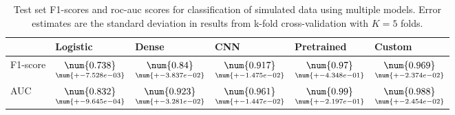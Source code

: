 \begin{table}
\centering
\caption{
Test set F1-scores and roc-auc scores for classification of simulated data using multiple models. 
Error estimates are the standard deviation in results from k-fold cross-validation 
with $K=5$ folds.
}
\label{tab:classification-simulated-f1-auc}
\begin{tabular}{llllll}
\toprule
{} &                                            Logistic &                                               Dense &                                                 CNN &                                         Pretrained &                                              Custom \\
\midrule
F1-score &  $\underset{\num{+- 7.528e-03 }  }{\num{ 0.738 } }$ &  $\underset{\num{+- 3.837e-02 }  }{\num{ 0.84 } }$ &  $\underset{\num{+- 1.475e-02 }  }{\num{ 0.917 } }$ &  $\underset{\num{+- 4.348e-01 }  }{\num{ 0.97 } }$ &  $\underset{\num{+- 2.374e-02 }  }{\num{ 0.969 } }$ \\
AUC      &  $\underset{\num{+- 9.645e-04 }  }{\num{ 0.832 } }$ &  $\underset{\num{+- 3.281e-02 }  }{\num{ 0.923 } }$ &  $\underset{\num{+- 1.447e-02 }  }{\num{ 0.961 } }$ &  $\underset{\num{+- 2.197e-01 }  }{\num{ 0.99 } }$ &  $\underset{\num{+- 2.454e-02 }  }{\num{ 0.988 } }$ \\
\bottomrule
\end{tabular}
\end{table}
